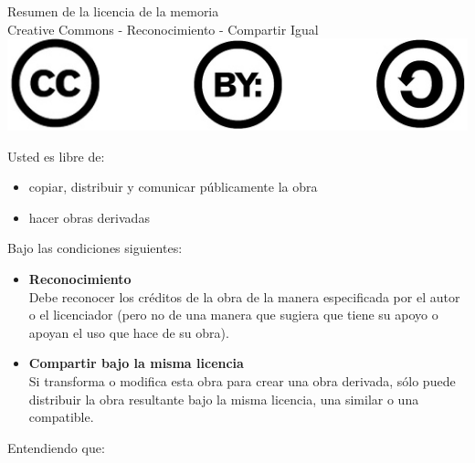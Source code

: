 \begin{center}
\Huge{Resumen de la licencia de la memoria}\\
\Large{Creative Commons - Reconocimiento - Compartir Igual}\\[1cm]
\includegraphics{imagenes/cc-by-sa.png}
\end{center}
          	       
Usted es libre de:
      \begin{itemize}
	\item{copiar, distribuir y comunicar públicamente la obra}
	\item{hacer obras derivadas}
      \end{itemize}
        
Bajo las condiciones siguientes:

	  \begin{itemize} 
            \item {\textbf{Reconocimiento}\\
		Debe reconocer los créditos de la obra de la manera especificada por el autor o el licenciador (pero no de una manera que sugiera que tiene su apoyo o apoyan el uso que hace de su obra).}
            
            \item {\par \textbf{Compartir bajo la misma licencia}\\
		Si transforma o modifica esta obra para crear una obra derivada, sólo puede distribuir la obra resultante bajo la misma licencia, una similar o una compatible.}

	  \end{itemize}
	
Entendiendo que:

